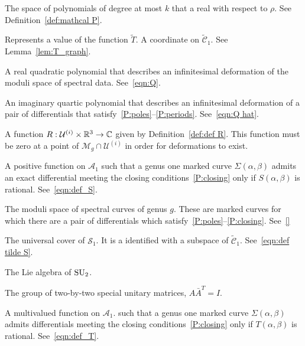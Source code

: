 \begin{description}[align=right]
\item[$\mathcal{P}^k_\R$] The space of polynomials of degree at most $k$ that a real with respect to $ρ$. See Definition~\ref{def:mathcal P}.

\item[$q$] Represents a value of the function $\tilde{T}$. A coordinate on $\mathcal{\tilde{C}}_1$. See Lemma~\ref{lem:T_graph}.

\item[$Q$] A real quadratic polynomial that describes an infinitesimal deformation of the moduli space of spectral data. See~\eqref{eqn:Q}.

\item[$\hat{Q}$] An imaginary quartic polynomial that describes an infinitesimal deformation of a pair of differentials that satisfy~\ref{P:poles}--\ref{P:periods}. See~\eqref{eqn:Q hat}.

\item[$R$] A function $R : \mathcal{U}^{(i)} \times \R^3 \to \C$ given by Definition~\ref{def:def R}. This function must be zero at a point of $\mathcal{M}_g \cap \mathcal{U}^{(i)}$ in order for deformations to exist.

\item[$S$] A positive function on $\mathcal{A}_1$ such that a genus one marked curve $Σ(α,β)$ admits an exact differential meeting the closing conditions~\ref{P:closing} only if $S(α,β)$ is rational. See~\eqref{eqn:def_S}.

\item[$\mathcal{S}_g$] The moduli space of spectral curves of genus $g$. These are marked curves for which there are a pair of differentials which satisfy~\ref{P:poles}--\ref{P:closing}. See~\ref{}

\item[$\mathcal{\tilde{S}}_1$] The universal cover of $\mathcal{S}_1$. It is a identified with a subspace of $\mathcal{\tilde{C}}_1$. See~\eqref{eqn:def tilde S}.

\item[$\su_2$] The Lie algebra of $\SU_2$.

\item[$\SU_2$] The group of two-by-two special unitary matrices, $A \bar{A}^T = I$.

\item[$T$] A multivalued function on $\mathcal{A}_1$. such that a genus one marked curve $Σ(α,β)$ admits differentials meeting the closing conditions~\ref{P:closing} only if $T(α,β)$ is rational. See~\eqref{eqn:def_T}.


\end{description}
